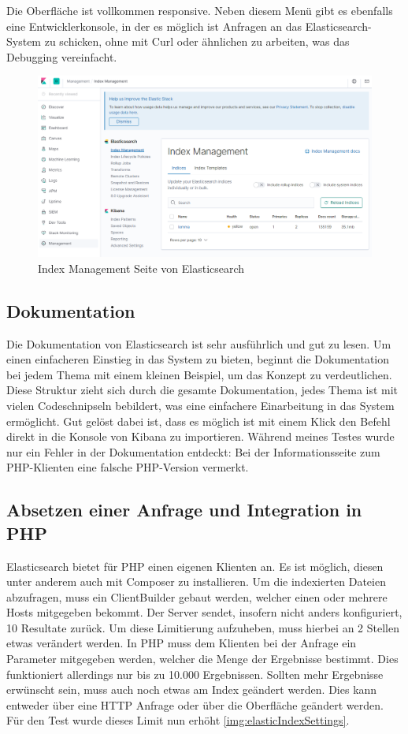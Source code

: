 Die Oberfläche ist vollkommen responsive. Neben diesem Menü gibt es ebenfalls eine Entwicklerkonsole, in der es möglich ist Anfragen an das Elasticsearch-System zu schicken, ohne mit Curl oder ähnlichen zu arbeiten, was das Debugging vereinfacht.

\begin{figure}
	\centering
	\includegraphics[width=1\linewidth]{images/elastic_ui.png}
	\caption{Index Management Seite von Elasticsearch}
	\label{img:elasticInterface}
\end{figure}


\subsection{Dokumentation}

Die Dokumentation von Elasticsearch ist sehr ausführlich und gut zu lesen. Um einen einfacheren Einstieg in das System zu bieten, beginnt die Dokumentation bei jedem Thema mit einem kleinen Beispiel, um das Konzept zu verdeutlichen. Diese Struktur zieht sich durch die gesamte Dokumentation, jedes Thema ist mit vielen Codeschnipseln bebildert, was eine einfachere Einarbeitung in das System ermöglicht. 
Gut gelöst dabei ist, dass es möglich ist mit einem Klick den Befehl direkt in die Konsole von Kibana zu importieren. Während meines Testes wurde nur ein Fehler in der Dokumentation entdeckt: Bei der Informationsseite zum PHP-Klienten eine falsche PHP-Version vermerkt.

\subsection{Absetzen einer Anfrage und Integration in PHP}

Elasticsearch bietet für PHP einen eigenen Klienten an. Es ist möglich, diesen unter anderem auch mit Composer zu installieren. Um die indexierten Dateien abzufragen, muss ein ClientBuilder gebaut werden, welcher einen oder mehrere Hosts mitgegeben bekommt. Der Server sendet, insofern nicht anders konfiguriert, 10 Resultate zurück. Um diese Limitierung aufzuheben, muss hierbei an 2 Stellen etwas verändert werden. In PHP muss dem Klienten bei der Anfrage ein Parameter mitgegeben werden, welcher die Menge der Ergebnisse bestimmt. Dies funktioniert allerdings nur bis zu 10.000 Ergebnissen. Sollten mehr Ergebnisse erwünscht sein, muss auch noch etwas am Index geändert werden. Dies kann entweder über eine HTTP Anfrage oder über die Oberfläche geändert werden. Für den Test wurde dieses Limit nun erhöht \ref{img:elasticIndexSettings}. 


